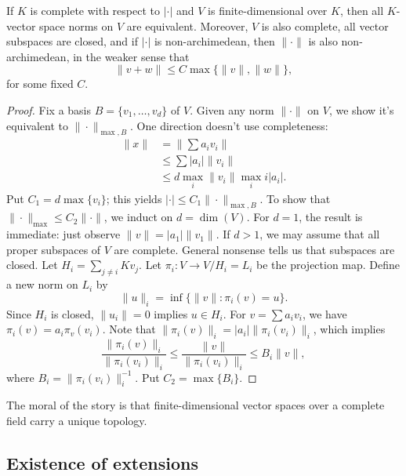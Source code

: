 \begin{theorem}\label{thm:unique-norm-vect}
If $K$ is complete with respect to $|\cdot|$ and $V$ is finite-dimensional over 
$K$, then all $K$-vector space norms on $V$ are equivalent. Moreover, $V$ is 
also complete, all vector subspaces are closed, and if $|\cdot|$ is 
non-archimedean, then $\|\cdot\|$ is also non-archimedean, in the weaker sense 
that 
\[
  \|v+w\| \leqslant C\max\{\|v\|,\|w\|\} ,
\]
for some fixed $C$. 
\end{theorem}
\begin{proof}
Fix a basis $B=\{v_1,\dots,v_d\}$ of $V$. Given any norm $\|\cdot\|$ on $V$, we 
show it's equivalent to $\|\cdot\|_{\max,B}$. One direction doesn't use 
completeness: 
\begin{align*}
  \|x\| 
    &= \left\|\sum a_i v_i\right\| \\
    &\leqslant \sum |a_i| \|v_i\| \\
    &\leqslant d \max_i \|v_i\| \max_ii |a_i| .
\end{align*}
Put $C_1=d \max\{v_i\}$; this yields 
$|\cdot|\leqslant C_1 \|\cdot\|_{\max,B}$. To show that 
$\|\cdot\|_{\max}\leqslant C_2\|\cdot\|$, we induct on $d=\dim(V)$. For $d=1$, 
the result is immediate: just observe $\|v\|=|a_1|\|v_1\|$. 
If $d>1$, we may assume that all proper subspaces of $V$ are complete. General 
nonsense tells us that subspaces are closed. Let $H_i=\sum_{j\ne i} K v_j$. 
Let $\pi_i\colon V\to V/H_i = L_i$ be the projection map. Define a new norm on $L_i$ 
by 
\[
  \|u\|_i = \inf\{\|v\|\colon \pi_i(v)=u\} .
\]
Since $H_i$ is closed, $\|u_i\|=0$ implies $u\in H_i$. For $v=\sum a_i v_i$, 
we have $\pi_i(v)=a_i \pi_v(v_i)$. Note that 
$\|\pi_i(v)\|_i = |a_i| \|\pi_i(v_i)\|_i$, which implies 
\[
  \frac{\|\pi_i(v)\|_i}{\|\pi_i(v_i)\|_i} \leqslant \frac{\|v\|}{\|\pi_i(v_i)\|_i} \leqslant B_i \|v\| ,
\]
where $B_i=\|\pi_i(v_i)\|_i^{-1}$. Put $C_2=\max\{B_i\}$. 
\end{proof}

The moral of the story is that finite-dimensional vector spaces over a complete 
field carry a unique topology. 



\subsection{Existence of extensions}

